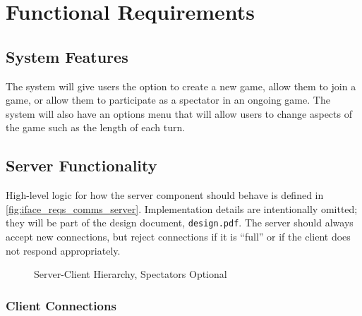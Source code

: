 \documentclass[letterpaper]{article}
\begin{document}

\section{Functional Requirements}
\label{sec:fun_reqs}

\subsection{System Features}
\label{sec:fun_reqs_system}

The system will give users the option to create a new game,
allow them to join a game, or allow them to participate as a
spectator in an ongoing game. The system will also have an
options menu that will allow users to change aspects of the game
such as the length of each turn.

\subsection{Server Functionality}
\label{sec:fun_reqs_server}

High-level logic for how the server component should behave is
defined in \cref{fig:iface_reqs_comms_server}. Implementation
details are intentionally omitted; they will be part of the
design document, \texttt{design.pdf}. The server should always
accept new connections, but reject connections if it is ``full''
or if the client does not respond appropriately.

\begin{figure}
    \caption{Server-Client Hierarchy, Spectators Optional}
    \label{fig:diagrams_sch}
\end{figure}

\subsubsection{Client Connections}
\label{sec:fun_reqs_server_client}
\end{document}

